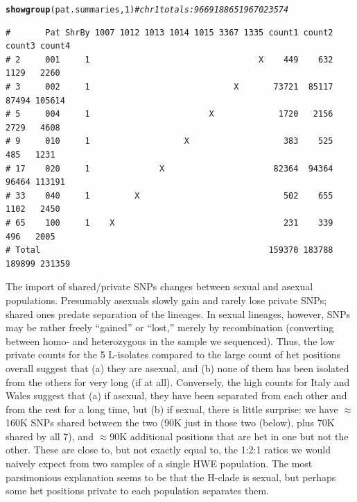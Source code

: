 \documentclass{article}\usepackage[]{graphicx}\usepackage[]{color}
\makeatletter
\newcommand{\hlnum}[1]{\textcolor[rgb]{0.686,0.059,0.569}{#1}}%
\newcommand{\hlcom}[1]{\textcolor[rgb]{0.678,0.584,0.686}{\textit{#1}}}%
\newcommand{\hlstd}[1]{\textcolor[rgb]{0.345,0.345,0.345}{#1}}%
\newcommand{\hlkwd}[1]{\textcolor[rgb]{0.737,0.353,0.396}{\textbf{#1}}}%
\newenvironment{kframe}{%
 \def\at@end@of@kframe{}%
 \ifinner\ifhmode%
  \def\at@end@of@kframe{\end{minipage}}%
  \begin{minipage}{\columnwidth}%
 \fi\fi%
 \def\FrameCommand##1{\hskip\@totalleftmargin \hskip-\fboxsep
 \colorbox{shadecolor}{##1}\hskip-\fboxsep
     \hskip-\linewidth \hskip-\@totalleftmargin \hskip\columnwidth}%
 \MakeFramed {\advance\hsize-\width
   \@totalleftmargin\z@ \linewidth\hsize
   \@setminipage}}%
 {\par\unskip\endMakeFramed%
 \at@end@of@kframe}
\newenvironment{knitrout}{}{} %
\makeatother
\begin{document}
\begin{knitrout}\footnotesize
{}\color{fgcolor}\begin{kframe}
\begin{alltt}
\hlkwd{showgroup}\hlstd{(pat.summaries,}\hlnum{1}\hlstd{)}  \hlcom{# chr1 totals: 9669  18865  19670  23574}
\end{alltt}
\begin{verbatim}
#       Pat ShrBy 1007 1012 1013 1014 1015 3367 1335 count1 count2 count3 count4
# 2     001     1                                  X    449    632   1129   2260
# 3     002     1                             X       73721  85117  87494 105614
# 5     004     1                        X             1720   2156   2729   4608
# 9     010     1                   X                   383    525    485   1231
# 17    020     1              X                      82364  94364  96464 113191
# 33    040     1         X                             502    655   1102   2450
# 65    100     1    X                                  231    339    496   2005
# Total                                              159370 183788 189899 231359
\end{verbatim}
\end{kframe}
\end{knitrout}

The import of shared/private SNPs changes between sexual and asexual populations.  Presumably asexuals 
slowly gain and rarely lose private SNPs; shared ones predate separation of the lineages.  In sexual 
lineages, however, SNPs may be rather freely ``gained'' or ``lost,'' merely by recombination (converting 
between homo- and heterozygous in the sample we sequenced). Thus, the low private counts for the 5 
L-isolates compared to the large count of het positions overall suggest that (a) they are asexual, 
and (b) none of them has been isolated from the others for very long (if at all).  Conversely, the 
high counts for Italy and Wales suggest that (a) if asexual, they have been separated from each other 
and from the rest for a long time, but (b) if sexual, there is little surprise: we have $\approx$160K 
SNPs shared between the two (90K just in those two (below), plus 70K shared by all 7), and $\approx$90K 
additional positions that are het in one but not the other.  These are close to, but not exactly equal 
to, the 1:2:1 ratios we would naively expect from two samples of a single HWE population.  The most 
parsimonious explanation seems to be that the H-clade is sexual, but perhaps some het positions private 
to each population separates them.
\end{document}
